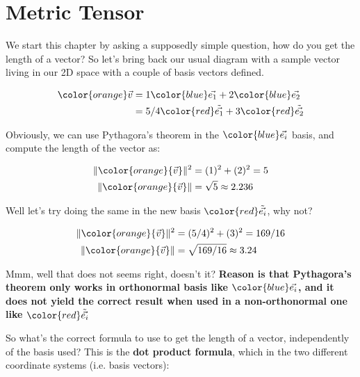 \section{Metric Tensor}

We start this chapter by asking a supposedly simple question, how do you get the length of a vector?
So let's bring back our usual diagram with a sample vector living in our 2D space with a couple of basis vectors defined.
\begin{center}

\end{center}

\begin{align*}
    \begingroup\color{orange}\vec{v}\endgroup &= 1\begingroup\color{blue}\vec{e_1}\endgroup + 2\begingroup\color{blue}\vec{e_2}\endgroup\\
    &= 5/4\begingroup\color{red}\tilde{\vec{e_1}}\endgroup + 3\begingroup\color{red}\tilde{\vec{e_2}}\endgroup
\end{align*}

Obviously, we can use Pythagora's theorem in the $\color{blue}\vec{e_i}$ basis, and compute 
the length of the vector as:

\begin{align*}
    \|\begingroup\color{orange}{\vec{v}}\endgroup\|^2 &= (1)^2 + (2)^2 = 5\\
    \|\begingroup\color{orange}{\vec{v}}\endgroup\| &= \sqrt{5} \approx 2.236
\end{align*}

Well let's try doing the same in the new basis $\color{red}\tilde{\vec{e_i}}$, why not?

\begin{align*}
    \|\begingroup\color{orange}{\vec{v}}\endgroup\|^2 &= (5/4)^2 + (3)^2 = 169/16\\
    \|\begingroup\color{orange}{\vec{v}}\endgroup\| &= \sqrt{169/16} \approx 3.24
\end{align*}

Mmm, well that does not seems right, doesn't it?
\textbf{Reason is that Pythagora's theorem only works in orthonormal basis like $\color{blue}\vec{e_i}$, and it does
not yield the correct result when used in a non-orthonormal one like $\color{red}\tilde{\vec{e_i}}$}


So what's the correct formula to use to get the length of a vector, independently of the basis used?
This is the \textbf{dot product formula}, which in the two different coordinate systems (i.e. basis vectors):

